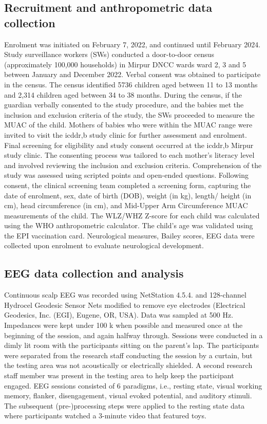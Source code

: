 \documentclass{article}
\begin{document}
\subsection{Recruitment and anthropometric data collection}
Enrolment was initiated on February 7, 2022, and continued until February 2024.
Study surveillance workers (SWs) conducted a door-to-door census (approximately 100,000 households) in Mirpur DNCC wards ward 2, 3 and 5 between January and December 2022.
Verbal consent was obtained to participate in the census.
The census identified 5736 children aged between 11 to 13 months and 2,314 children aged between 34 to 38 months.
During the census, if the guardian verbally consented to the study procedure, and the babies met the inclusion and exclusion criteria of the study, the SWs proceeded to measure the MUAC of the child.
Mothers of babies who were within the MUAC range were invited to visit the icddr,b study clinic for further assessment and enrolment.
Final screening for eligibility and study consent occurred at the icddr,b Mirpur study clinic.
The consenting process was tailored to each mother's literacy level and involved reviewing the inclusion and exclusion criteria.
Comprehension of the study was assessed using scripted points and open-ended questions.
Following consent, the clinical screening team completed a screening form, capturing the date of enrolment, sex, date of birth (DOB), weight (in kg), length/ height (in cm), head circumference (in cm), and Mid-Upper Arm Circumference MUAC measurements of the child.
The WLZ/WHZ Z-score for each child was calculated using the WHO anthropometric calculator.
The child's age was validated using the EPI vaccination card.
Neurological measures, Bailey scores, EEG data were collected upon enrolment to evaluate neurological development.

\subsection{EEG data collection and analysis}
Continuous scalp EEG was recorded using NetStation 4.5.4. and 128-channel Hydrocel Geodesic Sensor Nets modified to remove eye electrodes (Electrical Geodesics, Inc. (EGI), Eugene, OR, USA).
Data was sampled at 500 Hz.
Impedances were kept under 100 k\textohm{} when possible and measured once at the beginning of the session, and again halfway through.
Sessions were conducted in a dimly lit room with the participants sitting on the parent’s lap.
The participants were separated from the research staff conducting the session by a curtain, but the testing area was not acoustically or electrically shielded.
A second research staff member was present in the testing area to help keep the participant engaged.
EEG sessions consisted of 6 paradigms, i.e., resting state, visual working memory, flanker, disengagement, visual evoked potential, and auditory stimuli.
The subsequent (pre-)processing steps were applied to the resting state data where participants watched a 3-minute video that featured toys.
\end{document}
